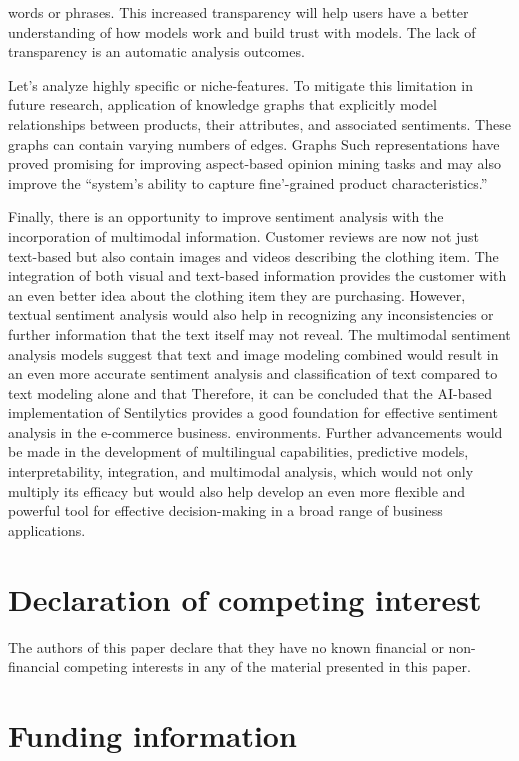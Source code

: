 \documentclass[11pt,a4paper]{article}
\begin{document}
words or phrases. This increased transparency will help users have a better understanding of how models work and build trust with models. The lack of transparency is an automatic analysis outcomes.
    

Let's analyze
highly specific or niche-features. To mitigate this limitation in future research, application of knowledge
graphs that explicitly model relationships between products, their attributes, and associated sentiments. These graphs can contain varying numbers of edges. Graphs
Such representations have proved promising for improving aspect-based opinion mining tasks and may also improve the
“system’s ability to capture fine’-grained product characteristics.”

Finally, there is an opportunity to improve sentiment analysis with the incorporation of multimodal information. Customer reviews are now not just text-based but also contain images and videos describing the clothing item. The integration of both visual and text-based information provides the customer with an even better idea about the clothing item they are purchasing.
However, textual sentiment analysis would also help in recognizing any inconsistencies or further information that the text itself may not reveal.
The multimodal sentiment analysis models suggest that text and image modeling combined would result in an even more accurate sentiment analysis and classification of text compared to text modeling alone and that
Therefore, it can be concluded that the AI-based implementation of Sentilytics provides a good foundation for effective sentiment analysis in the e-commerce business.
environments. Further advancements would be made in the development of multilingual capabilities, predictive models, interpretability, integration, and multimodal analysis, which would not only multiply its efficacy but would also help develop an even more flexible and powerful tool for effective decision-making in a broad range of business applications.


\section*{Declaration of competing interest}

The authors of this paper declare that they have no known financial or non-financial competing interests in any of the material presented in this paper.

\section*{Funding information}
\end{document}
